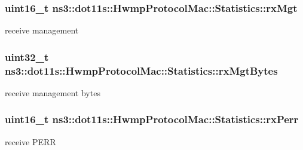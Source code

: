 \subsubsection[{\texorpdfstring{rx\+Mgt}{rxMgt}}]{\setlength{\rightskip}{0pt plus 5cm}uint16\+\_\+t ns3\+::dot11s\+::\+Hwmp\+Protocol\+Mac\+::\+Statistics\+::rx\+Mgt}\hypertarget{structns3_1_1dot11s_1_1HwmpProtocolMac_1_1Statistics_a2cc31314569586538efb043e29f0f8b6}{}\label{structns3_1_1dot11s_1_1HwmpProtocolMac_1_1Statistics_a2cc31314569586538efb043e29f0f8b6}


receive management 

\subsubsection[{\texorpdfstring{rx\+Mgt\+Bytes}{rxMgtBytes}}]{\setlength{\rightskip}{0pt plus 5cm}uint32\+\_\+t ns3\+::dot11s\+::\+Hwmp\+Protocol\+Mac\+::\+Statistics\+::rx\+Mgt\+Bytes}\hypertarget{structns3_1_1dot11s_1_1HwmpProtocolMac_1_1Statistics_abb4985a260d7a4c4442168ca98c79dec}{}\label{structns3_1_1dot11s_1_1HwmpProtocolMac_1_1Statistics_abb4985a260d7a4c4442168ca98c79dec}


receive management bytes 

\subsubsection[{\texorpdfstring{rx\+Perr}{rxPerr}}]{\setlength{\rightskip}{0pt plus 5cm}uint16\+\_\+t ns3\+::dot11s\+::\+Hwmp\+Protocol\+Mac\+::\+Statistics\+::rx\+Perr}\hypertarget{structns3_1_1dot11s_1_1HwmpProtocolMac_1_1Statistics_a4c2d00bd9896bba23fa3dabcb40c5b7e}{}\label{structns3_1_1dot11s_1_1HwmpProtocolMac_1_1Statistics_a4c2d00bd9896bba23fa3dabcb40c5b7e}


receive P\+E\+RR 

